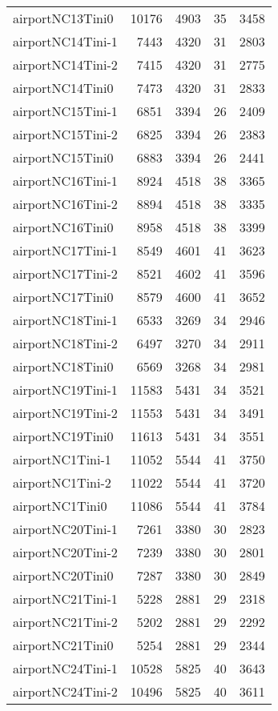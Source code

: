 \begin{longtable}{lrrrr}
airportNC13Tini0 & 10176 & 4903 & 35 & 3458 \\
airportNC14Tini-1 & 7443 & 4320 & 31 & 2803 \\
airportNC14Tini-2 & 7415 & 4320 & 31 & 2775 \\
airportNC14Tini0 & 7473 & 4320 & 31 & 2833 \\
airportNC15Tini-1 & 6851 & 3394 & 26 & 2409 \\
airportNC15Tini-2 & 6825 & 3394 & 26 & 2383 \\
airportNC15Tini0 & 6883 & 3394 & 26 & 2441 \\
airportNC16Tini-1 & 8924 & 4518 & 38 & 3365 \\
airportNC16Tini-2 & 8894 & 4518 & 38 & 3335 \\
airportNC16Tini0 & 8958 & 4518 & 38 & 3399 \\
airportNC17Tini-1 & 8549 & 4601 & 41 & 3623 \\
airportNC17Tini-2 & 8521 & 4602 & 41 & 3596 \\
airportNC17Tini0 & 8579 & 4600 & 41 & 3652 \\
airportNC18Tini-1 & 6533 & 3269 & 34 & 2946 \\
airportNC18Tini-2 & 6497 & 3270 & 34 & 2911 \\
airportNC18Tini0 & 6569 & 3268 & 34 & 2981 \\
airportNC19Tini-1 & 11583 & 5431 & 34 & 3521 \\
airportNC19Tini-2 & 11553 & 5431 & 34 & 3491 \\
airportNC19Tini0 & 11613 & 5431 & 34 & 3551 \\
airportNC1Tini-1 & 11052 & 5544 & 41 & 3750 \\
airportNC1Tini-2 & 11022 & 5544 & 41 & 3720 \\
airportNC1Tini0 & 11086 & 5544 & 41 & 3784 \\
airportNC20Tini-1 & 7261 & 3380 & 30 & 2823 \\
airportNC20Tini-2 & 7239 & 3380 & 30 & 2801 \\
airportNC20Tini0 & 7287 & 3380 & 30 & 2849 \\
airportNC21Tini-1 & 5228 & 2881 & 29 & 2318 \\
airportNC21Tini-2 & 5202 & 2881 & 29 & 2292 \\
airportNC21Tini0 & 5254 & 2881 & 29 & 2344 \\
airportNC24Tini-1 & 10528 & 5825 & 40 & 3643 \\
airportNC24Tini-2 & 10496 & 5825 & 40 & 3611 \\

\end{longtable}
